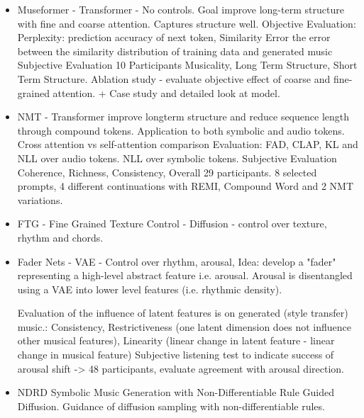\begin{itemize}
\item{Museformer} \cite{Yu_Lu_Wang_Hu_Tan_Ye_Zhang_museformer_2022} - Transformer - No controls. Goal improve long-term structure with fine and coarse attention. Captures structure well. 
Objective Evaluation: Perplexity: prediction accuracy of next token, Similarity Error the error between the similarity distribution of training data and generated
music 
Subjective Evaluation 10 Participants Musicality, Long Term Structure, Short Term Structure.
Ablation study - evaluate objective effect of coarse and fine-grained attention. + Case study and detailed look at model.

\item{NMT} \cite{Ryu_Dong_nested_2024} - Transformer improve longterm structure and reduce sequence length through compound tokens. Application to both symbolic and audio tokens. 
Cross attention vs self-attention comparison 
Evaluation: FAD, CLAP, KL and NLL over audio tokens. NLL over symbolic tokens. 
Subjective Evaluation Coherence, Richness, Consistency, Overall 29 participants. 8 selected prompts, 4 different continuations with REMI, Compound Word and 2 NMT variations.


\item{FTG - Fine Grained Texture Control} - Diffusion - control over texture, rhythm and chords. 

\item{Fader Nets}\cite{Tan_Herremans_2020} - VAE - Control over rhythm, arousal, 
Idea: develop a "fader" representing a high-level abstract feature i.e. arousal. Arousal is disentangled using a VAE into lower level features (i.e. rhythmic density).

Evaluation of the influence of latent features is on generated (style transfer) music.:
Consistency, Restrictiveness (one latent dimension does not influence other musical features), Linearity (linear change in latent feature - linear change in musical feature)
Subjective listening test to indicate success of arousal shift -> 48 participants, evaluate agreement with arousal direction. 

\item{NDRD} Symbolic Music Generation with Non-Differentiable Rule Guided Diffusion.
Guidance of diffusion sampling with non-differentiable rules. 
\end{itemize}

